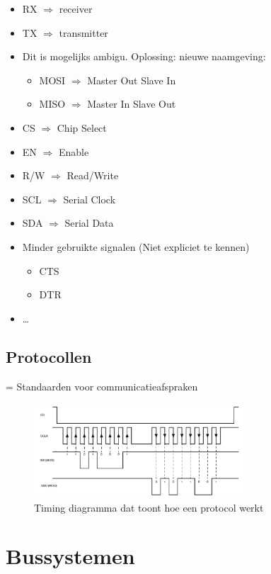 \documentclass{article}
\begin{document}
\begin{itemize}
    \item RX $\Rightarrow$ receiver
    \item TX $\Rightarrow$ transmitter
    \item Dit is mogelijks ambigu. Oplossing: nieuwe naamgeving:
    \begin{itemize}
        \item MOSI $\Rightarrow$ Master Out Slave In
        \item MISO $\Rightarrow$ Master In Slave Out
    \end{itemize}
    \item CS $\Rightarrow$ Chip Select
    \item EN $\Rightarrow$ Enable
    \item R/W $\Rightarrow$ Read/Write
    \item SCL $\Rightarrow$ Serial Clock
    \item SDA $\Rightarrow$ Serial Data
    \item Minder gebruikte signalen (Niet expliciet te kennen)
    \begin{itemize}
        \item CTS 
        \item DTR
    \end{itemize}
    \item \dots
\end{itemize}

\subsection{Protocollen}
= Standaarden voor communicatieafspraken

\begin{figure}[H]
    \centering
    \includegraphics[width=0.7\textwidth]{Screenshot_20200323_124324.png}
    \caption{Timing diagramma dat toont hoe een protocol werkt}
\end{figure}

\section{Bussystemen}
\end{document}
